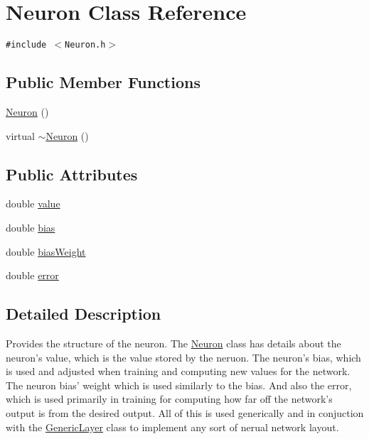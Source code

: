 \hypertarget{classNeuron}{
\section{Neuron Class Reference}
\label{classNeuron}
}
{\tt \#include $<$Neuron.h$>$}

\subsection*{Public Member Functions}
\begin{CompactItemize}
\item 
\hyperlink{classNeuron_823487d01615fadb8ac19a2768dd9d96}{Neuron} ()
\item 
virtual \hyperlink{classNeuron_94a250ce7e167760e593979b899745b1}{$\sim$Neuron} ()
\end{CompactItemize}
\subsection*{Public Attributes}
\begin{CompactItemize}
\item 
double \hyperlink{classNeuron_e1988ffe53bfd53ce979aecf01a164e3}{value}
\item 
double \hyperlink{classNeuron_7dc59218069023c3b8348a353902b0ac}{bias}
\item 
double \hyperlink{classNeuron_27aa94b5d7658f718711cedb3f96dc7f}{bias\-Weight}
\item 
double \hyperlink{classNeuron_d4d851d9f4f5dccb6283e5c19726e1e7}{error}
\end{CompactItemize}


\subsection{Detailed Description}
Provides the structure of the neuron. The \hyperlink{classNeuron}{Neuron} class has details about the neuron's value, which is the value stored by the neruon. The neuron's bias, which is used and adjusted when training and computing new values for the network. The neuron bias' weight which is used similarly to the bias. And also the error, which is used primarily in training for computing how far off the network's output is from the desired output. All of this is used generically and in conjuction with the \hyperlink{classGenericLayer}{Generic\-Layer} class to implement any sort of nerual network layout. 



